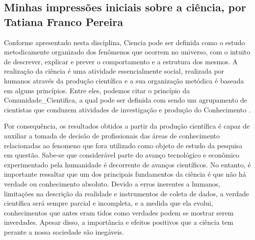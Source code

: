 \subsection{Minhas impressões iniciais sobre a ciência, por Tatiana Franco Pereira}

Conforme apresentado nesta disciplina, \gls{Ciencia} pode ser definida como o estudo metodicamente organizado dos fenômenos que ocorrem no universo, com o intuito de descrever, explicar e prever o comportamento e a estrutura dos mesmos.  A realização da ciência é uma atividade essencialmente social, realizada por humanos através da produção científica e a sua organização metódica é baseada em alguns princípios. Entre eles, podemos citar o princípio da \gls{Comunidade_Cientifica}, a qual pode ser definida com sendo um agrupamento de cientistas que conduzem atividades de investigação e produção do \gls{Conhecimento} \citep{wikipedia_ciencia_2022}. 

Por consequência, os resultados obtidos a partir da produção científica é capaz de auxiliar a tomada de decisão de profissionais das áreas de conhecimento relacionadas ao \gls{fenomeno} que fora utilizado como objeto de estudo da pesquisa em questão. Sabe-se que considerável parte do avanço tecnológico e econômico experimentado pela humanidade é decorrente de avanços científicos. No entanto, é importante ressaltar que um dos principais fundamentos da ciência é que não há verdade ou conhecimento absoluto. Devido a erros inerentes a humanos, limitações na descrição da realidade e instrumentos de coleta de dados, a verdade científica será sempre parcial e incompleta, e a medida que ela evolui, conhecimentos que antes eram tidos como verdades podem  se mostrar serem inverdades.  Apesar disso, a importância e efeitos positivos que a ciência tem perante a nossa sociedade são inegáveis.